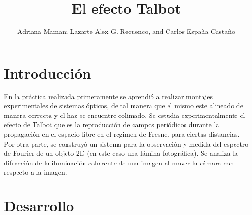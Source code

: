 \documentclass{./packages/optica-article}
\begin{document}
\title{El efecto Talbot}

\author{Adriana Mamani Lazarte Alex G. Recuenco, and Carlos España Castaño}

\address{Universidad Complutense de Madrid, Madrid, PC 28040, España}

\section{Introducción}
En la práctica realizada primeramente se aprendió a realizar montajes experimentales de sistemas ópticos, de tal manera que el mismo este alineado de manera correcta y el haz se encuentre colimado. Se estudia experimentalmente el efecto de Talbot que es la reproducción de campos periódicos durante la propagación en el espacio
libre en el régimen de Fresnel para ciertas distancias. Por otra parte, se construyó un sistema para la observación y medida del espectro de Fourier de un objeto 2D (en este caso una lámina fotográfica). Se analiza la difracción de la iluminación coherente de una imagen al mover la cámara con respecto a la imagen.

\section{Desarrollo}
\end{document}
